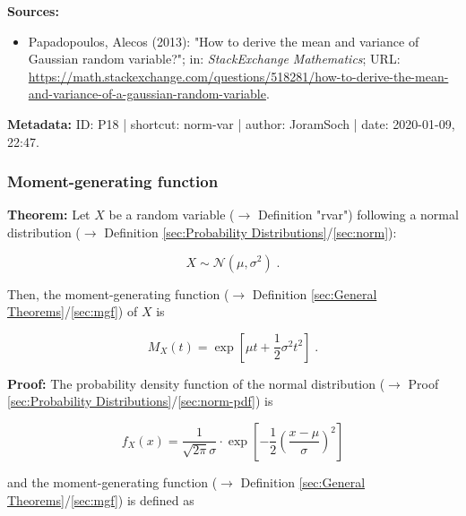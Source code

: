 \documentclass[a4paper,12pt]{book}
\begin{document}
\vspace{1em}
\textbf{Sources:}
\begin{itemize}
\item Papadopoulos, Alecos (2013): "How to derive the mean and variance of Gaussian random variable?"; in: \textit{StackExchange Mathematics}; URL: \url{https://math.stackexchange.com/questions/518281/how-to-derive-the-mean-and-variance-of-a-gaussian-random-variable}.
\end{itemize}


\vspace{1em}
\textbf{Metadata:} ID: P18 | shortcut: norm-var | author: JoramSoch | date: 2020-01-09, 22:47.


\subsubsection[\textbf{Moment-generating function}]{Moment-generating function} \label{sec:norm-mgf}

\vspace{1em}
\textbf{Theorem:} Let $X$ be a random variable ($\rightarrow$ Definition "rvar") following a normal distribution ($\rightarrow$ Definition \ref{sec:Probability Distributions}/\ref{sec:norm}):

\begin{equation} \label{eq:norm-mgf-norm}
X \sim \mathcal{N}(\mu, \sigma^2) \; .
\end{equation}

Then, the moment-generating function ($\rightarrow$ Definition \ref{sec:General Theorems}/\ref{sec:mgf}) of $X$ is

\begin{equation} \label{eq:norm-mgf-norm-mgf}
M_X(t) = \exp\left[ \mu t + \frac{1}{2} \sigma^2 t^2 \right] \; .
\end{equation}


\vspace{1em}
\textbf{Proof:} The probability density function of the normal distribution ($\rightarrow$ Proof \ref{sec:Probability Distributions}/\ref{sec:norm-pdf}) is

\begin{equation} \label{eq:norm-mgf-norm-pdf}
f_X(x) = \frac{1}{\sqrt{2 \pi} \sigma} \cdot \exp \left[ -\frac{1}{2} \left( \frac{x-\mu}{\sigma} \right)^2 \right]
\end{equation}

and the moment-generating function ($\rightarrow$ Definition \ref{sec:General Theorems}/\ref{sec:mgf}) is defined as
\end{document}
